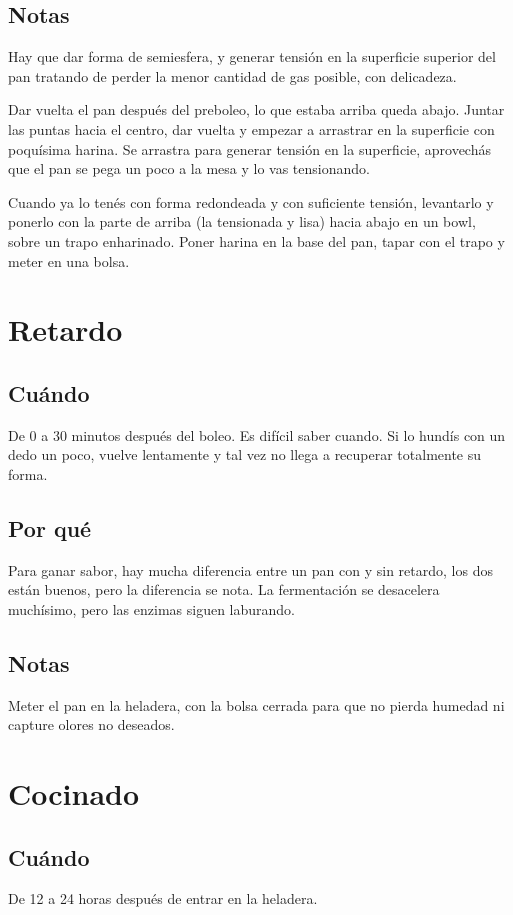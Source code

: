 \documentclass[10pt,a4paper]{article}
\begin{document}
\subsection*{Notas}
Hay que dar forma de semiesfera, y generar tensión en la superficie superior del pan tratando de perder la menor cantidad de gas posible, con delicadeza.

Dar vuelta el pan después del preboleo, lo que estaba arriba queda abajo. Juntar
las puntas hacia el centro, dar vuelta y empezar a arrastrar en la superficie
con poquísima harina. Se arrastra para generar tensión en la superficie,
aprovechás que el pan se pega un poco a la mesa y lo vas tensionando.

Cuando ya lo tenés con forma redondeada y con suficiente tensión, levantarlo y
ponerlo con la parte de arriba (la tensionada y lisa) hacia abajo en un bowl,
sobre un trapo enharinado. Poner harina en la base del pan, tapar con el trapo y
meter en una bolsa.

\section{Retardo}
\subsection*{Cuándo}
De 0 a 30 minutos después del boleo. Es difícil saber cuando. Si lo hundís con
un dedo un poco, vuelve lentamente y tal vez no llega a recuperar totalmente su forma.
\subsection*{Por qué}
Para ganar sabor, hay mucha diferencia entre un pan con y sin
retardo, los dos están buenos, pero la diferencia se nota. La fermentación se
desacelera muchísimo, pero las enzimas siguen laburando.

\subsection*{Notas}
Meter el pan en la heladera, con la bolsa cerrada para que no pierda humedad ni
capture olores no deseados.

\section{Cocinado}
\subsection*{Cuándo}
De 12 a 24 horas después de entrar en la heladera.
\end{document}
